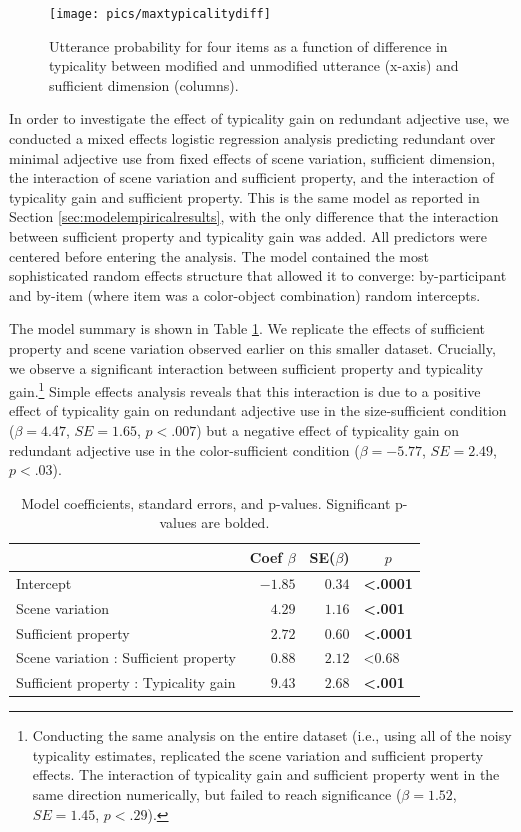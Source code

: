 \documentclass[11pt]{article}
\newcommand{\tableref}[1]{Table \ref{#1}}
\newcommand{\sectionref}[1]{Section \ref{#1}}
\begin{document}
\begin{figure}
\centering
\texttt{[image: pics/maxtypicalitydiff]}
\caption{Utterance probability for four items as a function of difference in typicality between modified and unmodified utterance (x-axis) and sufficient dimension (columns). }
\label{fig:maxtypicalitydiff}
\end{figure}

In order to investigate the effect of typicality gain on redundant adjective use, we conducted a mixed effects logistic regression analysis predicting redundant over minimal adjective use from fixed effects of scene variation, sufficient dimension, the interaction of scene variation and sufficient property, and the interaction of typicality gain and sufficient property. This is the same model as reported in \sectionref{sec:modelempiricalresults}, with the only difference that the interaction between sufficient property and typicality gain was added. All predictors were centered before entering the analysis. The model contained the most sophisticated random effects structure that allowed it to converge: by-participant and by-item (where item was a color-object combination) random intercepts. 

The model summary is shown in \tableref{tab:colortypicalityresults}. We replicate the effects of sufficient property and scene variation observed earlier on this smaller dataset. Crucially, we observe a significant interaction between sufficient property and typicality gain.\footnote{Conducting the same analysis on the entire dataset (i.e., using all of the noisy typicality estimates, replicated the scene variation and sufficient property effects. The interaction of typicality gain and sufficient property went in the same direction numerically, but failed to reach significance ($\beta = 1.52$, $SE = 1.45$, $p < .29$).} Simple effects analysis reveals that this interaction is due to a positive effect of typicality gain on redundant adjective use in the size-sufficient condition ($\beta = 4.47$, $SE = 1.65$, $p < .007$) but a negative effect of typicality gain on redundant adjective use in the color-sufficient condition  ($\beta = -5.77$, $SE = 2.49$, $p < .03$). 

\begin{table}[!tbp]
\caption{Model coefficients, standard errors, and p-values. Significant p-values are bolded.}
\begin{center}
\begin{tabular}{lrrl}
\toprule
\multicolumn{1}{l}{}&\multicolumn{1}{c}{Coef $\beta$}&\multicolumn{1}{c}{SE($\beta$)}&\multicolumn{1}{c}{$p$}\tabularnewline
\midrule
Intercept&$-1.85$&$0.34$&\textbf{\textless .0001}\tabularnewline
Scene variation&$ 4.29$&$1.16$&\textbf{\textless .001}\tabularnewline
Sufficient property&$ 2.72$&$0.60$&\textbf{\textless .0001}\tabularnewline
Scene variation : Sufficient property&$ 0.88$&$2.12$&\textless 0.68\tabularnewline
Sufficient property : Typicality gain&$ 9.43$&$2.68$&\textbf{\textless .001}\tabularnewline
\bottomrule
\end{tabular}\end{center}
\label{tab:colortypicalityresults}
\end{table}
\end{document}
